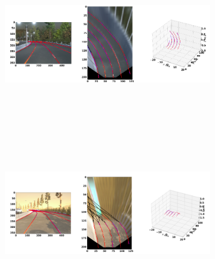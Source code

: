     \begin{figure}[h]
      \caption{Qualitative results of the GenLaneNet\cite{guo2020gen} trained with complex binary lane segmentation architecture on rarely observed scenes from sim3D\cite{guo2020gen} dataset: (a) uphill (b) downhill scenario. The ground-truth lines are color-coded in red and the predicted lanes in blue.}
        \centering
        \begin{subfigure}{1\textwidth}
        \includegraphics[width=1\linewidth, height=7cm]{images/uphill_rare.png} 
        \caption{}
        \label{fig:subim1}
        \end{subfigure}
        \begin{subfigure}{1\textwidth}
        \includegraphics[width=1\linewidth,height=7cm]{images/downhill_rare.png}
        \caption{}
        \label{fig:subim2}
        \end{subfigure}
        \end{figure}
        

